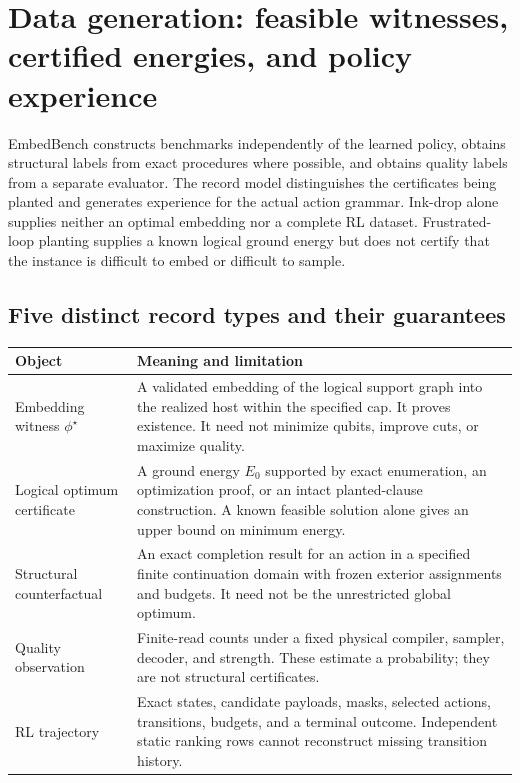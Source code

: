 \section{Data generation: feasible witnesses, certified energies, and policy experience}
\label{data:overview}

EmbedBench constructs benchmarks independently of the learned policy, obtains structural labels from exact procedures where possible, and obtains quality labels from a separate evaluator. The record model distinguishes the certificates being planted and generates experience for the actual action grammar. Ink-drop alone supplies neither an optimal embedding nor a complete RL dataset. Frustrated-loop planting supplies a known logical ground energy but does not certify that the instance is difficult to embed or difficult to sample.

\subsection{Five distinct record types and their guarantees}
\label{data:labels}

{\small
\begin{longtable}{@{}p{}p{}@{}}
\toprule
Object & Meaning and limitation \\
\midrule
\endhead
Embedding witness $\phi^\star$ & A validated embedding of the logical support graph into the realized host within the specified cap. It proves existence. It need not minimize qubits, improve cuts, or maximize quality. \\
Logical optimum certificate & A ground energy $E_0$ supported by exact enumeration, an optimization proof, or an intact planted-clause construction. A known feasible solution alone gives an upper bound on minimum energy. \\
Structural counterfactual & An exact completion result for an action in a specified finite continuation domain with frozen exterior assignments and budgets. It need not be the unrestricted global optimum. \\
Quality observation & Finite-read counts under a fixed physical compiler, sampler, decoder, and strength. These estimate a probability; they are not structural certificates. \\
RL trajectory & Exact states, candidate payloads, masks, selected actions, transitions, budgets, and a terminal outcome. Independent static ranking rows cannot reconstruct missing transition history. \\
\bottomrule
\end{longtable}}


